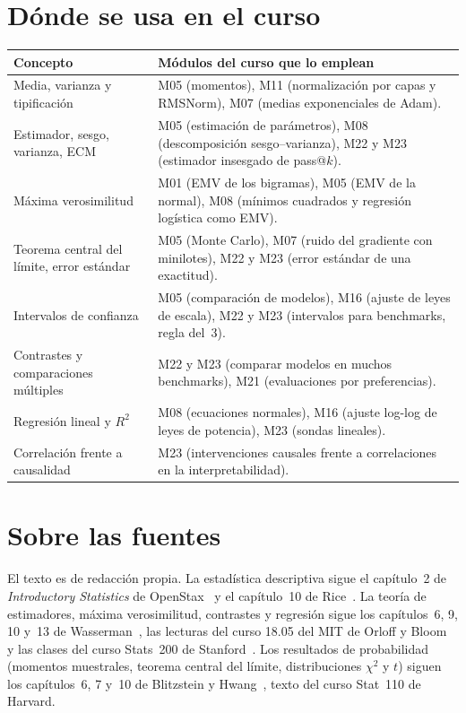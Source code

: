\documentclass[11pt,a4paper,twoside,openany]{book}
\begin{document}
\section*{Dónde se usa en el curso}
\begin{center}
\small
\begin{tabularx}{\textwidth}{@{}>{\raggedright\arraybackslash}p{4.6cm}X@{}}
\toprule
Concepto & Módulos del curso que lo emplean \\
\midrule
Media, varianza y tipificación & M05 (momentos), M11 (normalización por capas y RMSNorm), M07 (medias exponenciales de Adam). \\
Estimador, sesgo, varianza, ECM & M05 (estimación de parámetros), M08 (descomposición sesgo--varianza), M22 y M23 (estimador insesgado de pass@$k$). \\
Máxima verosimilitud & M01 (EMV de los bigramas), M05 (EMV de la normal), M08 (mínimos cuadrados y regresión logística como EMV). \\
Teorema central del límite, error estándar & M05 (Monte Carlo), M07 (ruido del gradiente con minilotes), M22 y M23 (error estándar de una exactitud). \\
Intervalos de confianza & M05 (comparación de modelos), M16 (ajuste de leyes de escala), M22 y M23 (intervalos para benchmarks, regla del~3). \\
Contrastes y comparaciones múltiples & M22 y M23 (comparar modelos en muchos benchmarks), M21 (evaluaciones por preferencias). \\
Regresión lineal y $R^{2}$ & M08 (ecuaciones normales), M16 (ajuste log-log de leyes de potencia), M23 (sondas lineales). \\
Correlación frente a causalidad & M23 (intervenciones causales frente a correlaciones en la interpretabilidad). \\
\bottomrule
\end{tabularx}
\end{center}

\section*{Sobre las fuentes}
El texto es de redacción propia. La estadística descriptiva sigue el capítulo~2 de \emph{Introductory Statistics} de OpenStax~\cite{openstax} y el capítulo~10 de Rice~\cite{rice}. La teoría de estimadores, máxima verosimilitud, contrastes y regresión sigue los capítulos~6, 9, 10 y~13 de Wasserman~\cite{wasserman}, las lecturas del curso 18.05 del MIT de Orloff y Bloom~\cite{mit1805} y las clases del curso Stats~200 de Stanford~\cite{stats200}. Los resultados de probabilidad (momentos muestrales, teorema central del límite, distribuciones $\chi^{2}$ y $t$) siguen los capítulos~6, 7 y~10 de Blitzstein y Hwang~\cite{bh}, texto del curso Stat~110 de Harvard.
\end{document}
